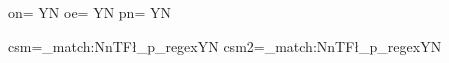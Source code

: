 \documentclass{article}
\begin{document}
on= Y\else N\fi{}
oe= Y\else N\fi{}
pn= Y\else N\fi

csm=\ExplSyntaxOn\regex_match:NnTF\l_p_regex{\foo}{Y}{N}\ExplSyntaxOff{}
csm2=\ExplSyntaxOn\regex_match:NnTF\l_p_regex{}{Y}{N}\ExplSyntaxOff
\end{document}
